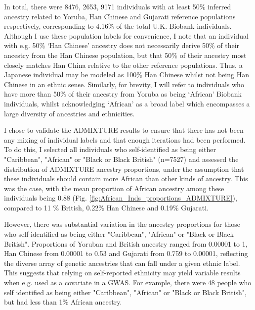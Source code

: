 In total, there were 8476, 2653, 9171 individuals with at least 50\% inferred ancestry related to Yoruba, Han Chinese and Gujarati reference populations respectively, corresponding to 4.16\% of the total U.K. Biobank individuals. Although I use these population labels for convenience, I note that an individual with e.g. 50\% `Han Chinese' ancestry does not necessarily derive 50\% of their ancestry from the Han Chinese population, but that 50\% of their ancestry most closely matches Han China relative to the other reference populations. Thus, a Japanese individual may be modeled as 100\% Han Chinese whilst not being Han Chinese in an ethnic sense. Similarly, for brevity, I will refer to individuals who have more than 50\% of their ancestry from Yoruba as being `African' Biobank individuals, whilst acknowledging `African' as a broad label which encompasses a large diversity of ancestries and ethnicities.  

I chose to validate the ADMIXTURE results to ensure that there has not been any mixing of individual labels and that enough iterations had been performed. To do this, I selected all individuals who self-identified as being either "Caribbean", "African" or "Black or Black British" (n=7527) and assessed the distribution of ADMIXTURE ancestry proportions, under the assumption that these individuals should contain more African than other kinds of ancestry. This was the case, with the mean proportion of African ancestry among these individuals being 0.88 (Fig. \ref{fig:African_Inds_proportions_ADMIXTURE}), compared to 11 \% British, 0.22\% Han Chinese and 0.19\% Gujarati.

However, there was substantial variation in the ancestry proportions for those who self-identified as being either "Caribbean", "African" or "Black or Black British". Proportions of Yoruban and British ancestry ranged from 0.00001 to 1, Han Chinese from 0.00001 to 0.53 and Gujarati from 0.759 to 0.00001, reflecting the diverse array of genetic ancestries that can fall under a given ethnic label. This suggests that relying on self-reported ethnicity may yield variable results when e.g. used as a covariate in a GWAS. For example, there were 48 people who self identified as being either "Caribbean", "African" or "Black or Black British", but had less than 1\% African ancestry.


